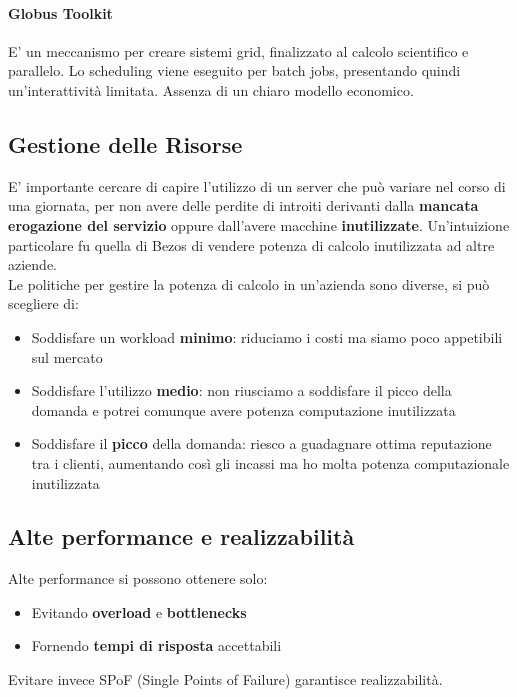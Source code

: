 \documentclass{article}
\begin{document}
		\paragraph{Globus Toolkit}
		E' un meccanismo per creare sistemi grid, finalizzato al calcolo scientifico e parallelo. Lo scheduling viene eseguito per batch jobs, presentando quindi un'interattività limitata. Assenza di un chiaro modello economico.
		
		\subsection{Gestione delle Risorse}
		E' importante cercare di capire l'utilizzo di un server che può variare nel corso di una giornata, per non avere delle perdite di introiti derivanti dalla \textbf{mancata erogazione del servizio} oppure dall'avere macchine \textbf{inutilizzate}. Un'intuizione particolare fu quella di Bezos di vendere potenza di calcolo inutilizzata ad altre aziende.\\
		
		Le politiche per gestire la potenza di calcolo in un'azienda sono diverse, si può scegliere di:
		\begin{itemize}
		    \item Soddisfare un workload \textbf{minimo}: riduciamo i costi ma siamo poco appetibili sul mercato
		    \item Soddisfare l'utilizzo \textbf{medio}: non riusciamo a soddisfare il picco della domanda e potrei comunque avere potenza computazione inutilizzata
		    \item Soddisfare il \textbf{picco} della domanda: riesco a guadagnare ottima reputazione tra i clienti, aumentando così gli incassi ma ho molta potenza computazionale inutilizzata
		\end{itemize}
		
		\subsection{Alte performance e realizzabilità}
		Alte performance si possono ottenere solo:
		\begin{itemize}
		    \item Evitando \textbf{overload} e \textbf{bottlenecks}
		    \item Fornendo \textbf{tempi di risposta} accettabili
		\end{itemize}
		Evitare invece SPoF (Single Points of Failure) garantisce realizzabilità. 
		
\end{document}
